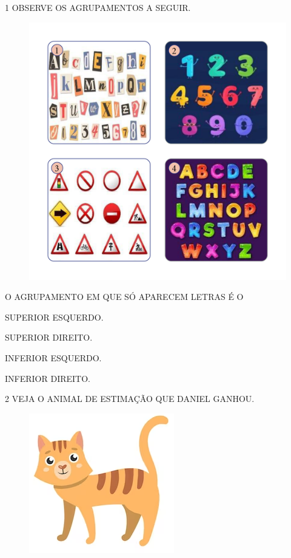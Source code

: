 
\num{1} OBSERVE OS AGRUPAMENTOS A SEGUIR.

\begin{figure}[H]
\includegraphics[width=\textwidth]{media/image183a186}
\end{figure}

O AGRUPAMENTO EM QUE SÓ APARECEM LETRAS É O

\begin{multicols}{2}
\begin{escolha}
\item SUPERIOR ESQUERDO.

\item SUPERIOR DIREITO.

\item INFERIOR ESQUERDO.

\item INFERIOR DIREITO.
\end{escolha}
\end{multicols}

\pagebreak
\num{2} VEJA O ANIMAL DE ESTIMAÇÃO QUE DANIEL GANHOU.

\begin{figure}[htpb!]
\centering
\includegraphics[width=.4\textwidth]{media/image187.png}
\end{figure}

